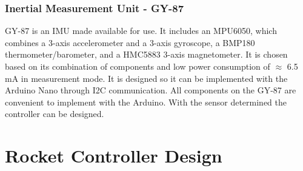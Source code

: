 \subsubsection{Inertial Measurement Unit - GY-87}
GY-87\cite{web:GY80} is an IMU made available for use. It includes an MPU6050, which combines a 3-axis accelerometer and a 3-axis gyroscope, a BMP180 thermometer/barometer, and a HMC5883 3-axis magnetometer. It is chosen based on its combination of components and low power consumption of $\approx$ 6.5 mA in measurement mode. It is designed so it can be implemented with the Arduino Nano through I2C communication. 
All components on the GY-87 are convenient to implement with the Arduino. With the sensor determined the controller can be designed.

\section{Rocket Controller Design}\label{sec:RocketControllerDesign}




  
